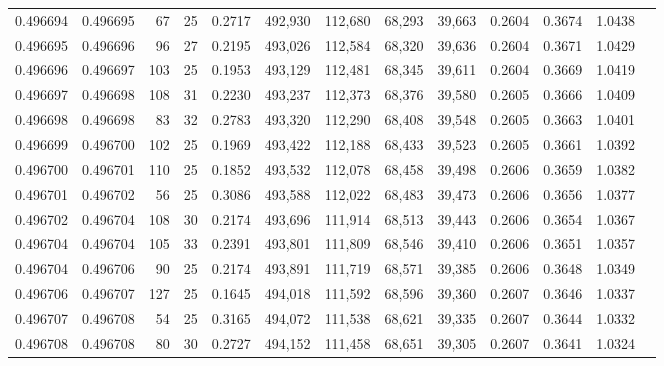 \begin{tabular}{rrrrrrrrrrrrr}
0.496694 & 0.496695 &  67 &  25 &                                     0.2717 & 492,930 & 112,680 &  68,293 &  39,663 & 0.2604 & 0.3674 & 1.0438 \\
0.496695 & 0.496696 &  96 &  27 &                                     0.2195 & 493,026 & 112,584 &  68,320 &  39,636 & 0.2604 & 0.3671 & 1.0429 \\
0.496696 & 0.496697 & 103 &  25 &                                     0.1953 & 493,129 & 112,481 &  68,345 &  39,611 & 0.2604 & 0.3669 & 1.0419 \\
0.496697 & 0.496698 & 108 &  31 &                                     0.2230 & 493,237 & 112,373 &  68,376 &  39,580 & 0.2605 & 0.3666 & 1.0409 \\
0.496698 & 0.496698 &  83 &  32 &                                     0.2783 & 493,320 & 112,290 &  68,408 &  39,548 & 0.2605 & 0.3663 & 1.0401 \\
0.496699 & 0.496700 & 102 &  25 &                                     0.1969 & 493,422 & 112,188 &  68,433 &  39,523 & 0.2605 & 0.3661 & 1.0392 \\
0.496700 & 0.496701 & 110 &  25 &                                     0.1852 & 493,532 & 112,078 &  68,458 &  39,498 & 0.2606 & 0.3659 & 1.0382 \\
0.496701 & 0.496702 &  56 &  25 &                                     0.3086 & 493,588 & 112,022 &  68,483 &  39,473 & 0.2606 & 0.3656 & 1.0377 \\
0.496702 & 0.496704 & 108 &  30 &                                     0.2174 & 493,696 & 111,914 &  68,513 &  39,443 & 0.2606 & 0.3654 & 1.0367 \\
0.496704 & 0.496704 & 105 &  33 &                                     0.2391 & 493,801 & 111,809 &  68,546 &  39,410 & 0.2606 & 0.3651 & 1.0357 \\
0.496704 & 0.496706 &  90 &  25 &                                     0.2174 & 493,891 & 111,719 &  68,571 &  39,385 & 0.2606 & 0.3648 & 1.0349 \\
0.496706 & 0.496707 & 127 &  25 &                                     0.1645 & 494,018 & 111,592 &  68,596 &  39,360 & 0.2607 & 0.3646 & 1.0337 \\
0.496707 & 0.496708 &  54 &  25 &                                     0.3165 & 494,072 & 111,538 &  68,621 &  39,335 & 0.2607 & 0.3644 & 1.0332 \\
0.496708 & 0.496708 &  80 &  30 &                                     0.2727 & 494,152 & 111,458 &  68,651 &  39,305 & 0.2607 & 0.3641 & 1.0324 \\

\end{tabular}
